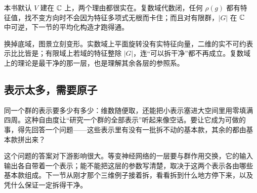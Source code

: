本书默认 \(V\) 建在 \(\mathbb{C}\) 上，两个理由都很实在。复数域代数闭，任何 \(\rho(g)\) 都有特征值，找不变方向时不会因为特征多项式无根而卡住；而且对有限群，\(|G|\) 在 \(\mathbb{C}\) 中可逆，下一节的平均化构造才跑得通。

换掉底域，图景立刻变形。实数域上平面旋转没有实特征向量，二维的实不可约表示比比皆是；有限域上若域的特征整除 \(|G|\)，连``可以拆干净''都不再成立。复数域上的理论是最干净的那一层，也是理解其余各层的参照系。

\subsection{表示太多，需要原子}

同一个群的表示要多少有多少：维数随便取，还能把小表示塞进大空间里用零填满四周。这种自由度让``研究一个群的全部表示''听起来像空话。要让它成为可做的事，得先回答一个问题——这些表示里有没有一批拆不动的基本款，其余的都由基本款拼出来？

这个问题的答案对下游影响很大。等变神经网络的一层要与群作用交换，它的输入输出各自带着一个表示；能不能把这层的参数写清楚，取决于这两个表示各由哪些基本款组成。下一节从刚才那个三维例子接着拆，看看拆到什么地方停下来，以及凭什么保证一定拆得干净。

